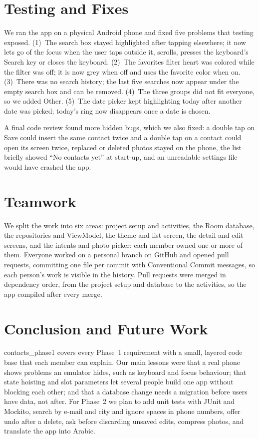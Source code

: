 \documentclass[sigconf,nonacm]{acmart}
\begin{document}
\section{Testing and Fixes}
We ran the app on a physical Android phone and fixed five problems that testing exposed. (1)~The
search box stayed highlighted after tapping elsewhere; it now lets go of the focus when the user
taps outside it, scrolls, presses the keyboard's Search key or closes the keyboard. (2)~The
favorites filter heart was colored while the filter was off; it is now grey when off and uses the
favorite color when on. (3)~There was no search history; the last five searches now appear under
the empty search box and can be removed. (4)~The three groups did not fit everyone, so we added
Other. (5)~The date picker kept highlighting today after another date was picked; today's ring now
disappears once a date is chosen.

A final code review found more hidden bugs, which we also fixed: a double tap on Save could insert
the same contact twice and a double tap on a contact could open its screen twice, replaced or
deleted photos stayed on the phone, the list briefly showed ``No contacts yet'' at start-up, and an
unreadable settings file would have crashed the app.

\section{Teamwork}
We split the work into six areas: project setup and activities, the Room database, the
repositories and ViewModel, the theme and list screen, the detail and edit screens, and the
intents and photo picker; each member owned one or more of them. Everyone worked on a personal
branch on GitHub and opened pull requests, committing one file per commit with Conventional Commit
messages, so each person's work is visible in the history. Pull requests were merged in dependency
order, from the project setup and database to the activities, so the app compiled after every merge.

\section{Conclusion and Future Work}
contacts\_phase1 covers every Phase~1 requirement with a small, layered code base that each member
can explain. Our main lessons were that a real phone shows problems an emulator hides, such as
keyboard and focus behaviour; that state hoisting and slot parameters let several people build
one app without blocking each other; and that a database change needs a migration before users
have data, not after. For Phase~2 we plan to add unit tests with JUnit and Mockito, search by e-mail and city
and ignore spaces in phone numbers, offer undo after a delete, ask before discarding unsaved edits,
compress photos, and translate the app into Arabic.



\end{document}
